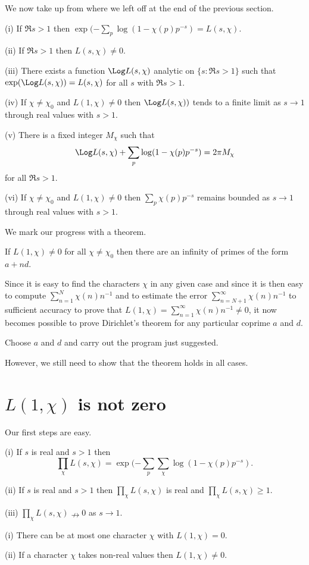 We now take up from where we left off at the end 
of the previous section.
\begin{lemma}  (i) If $\Re s>1$ then
$\exp(-\sum_{p}\log(1-\chi(p)p^{-s})=L(s,\chi)$.

(ii) If $\Re s>1$ then $L(s,\chi)\neq 0$.

(iii) There exists a function $\Log L(s,\chi)$ analytic
on $\{s: \Re s>1\}$ such that $\exp(\Log L(s,\chi))=L(s,\chi)$
for all $s$ with $\Re s>1$.

(iv) If $\chi\neq \chi_{0}$ and
$L(1,\chi)\neq 0$ then $\Log L(s,\chi))$ tends to
a finite limit as $s\rightarrow 1$ through real values with $s>1$.

(v) There is a fixed integer $M_{\chi}$ such that
\[\Log L(s,\chi)+\sum_{p}\log(1-\chi(p)p^{-s})=2\pi M_{\chi}\]
for all $\Re s>1$.

(vi) If $\chi\neq\chi_{0}$ and $L(1,\chi)\neq 0$ then
$\sum_{p}\chi(p)p^{-s}$ remains bounded as 
$s\rightarrow 1$ through real values with $s>1$.
\end{lemma}

We mark our progress with a theorem.
\begin{theorem} If $L(1,\chi)\neq 0$ for all $\chi\neq\chi_{0}$
then there are an infinity of primes of the form
$a+nd$.
\end{theorem}

Since it is easy to find the characters $\chi$ in any given case
and since it is then easy to compute $\sum_{n=1}^{N}\chi(n)n^{-1}$
and to estimate the error $\sum_{n=N+1}^{\infty}\chi(n)n^{-1}$
to sufficient accuracy to prove that
$L(1,\chi)=\sum_{n=1}^{\infty}\chi(n)n^{-1}\neq 0$,
it now becomes possible to prove Dirichlet's theorem
for any particular coprime  $a$ and $d$.
\begin{exercise} Choose $a$ and $d$ and carry out the
program just suggested.
\end{exercise}
However, we still need to show that the  theorem holds
in all cases.
\section{$L(1,\chi)$ is not zero} Our first steps are easy.
\begin{lemma} (i) If $s$ is real and $s>1$ then
\[\prod_{\chi}L(s,\chi)=
\exp(-\sum_{p}\sum_{\chi}\log(1-\chi(p)p^{-s}).\]

(ii) If $s$ is real and $s>1$ then $\prod_{\chi}L(s,\chi)$
is real and $\prod_{\chi}L(s,\chi)\geq 1$.

(iii) $\prod_{\chi}L(s,\chi)\nrightarrow 0$ as
$s\rightarrow 1$.
\end{lemma}
\begin{lemma} (i) There can be at most one character
$\chi$ with $L(1,\chi)=0$.

(ii) If a character $\chi$ takes non-real values
then $L(1,\chi)\neq 0$.
\end{lemma}

